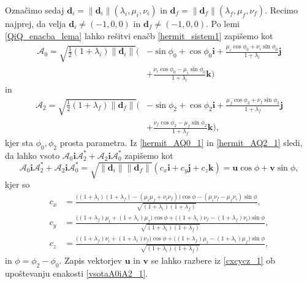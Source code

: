 \documentclass[12pt,a4paper,twoside]{article}
\theoremstyle{definition} %
\theoremstyle{plain} %
\theoremstyle{primerstyle}
\numberwithin{equation}{section}  %
\newcommand{\dV}{\mathbf{d}}
\newcommand{\iV}{\mathbf{i}}
\newcommand{\jV}{\mathbf{j}}
\newcommand{\kV}{\mathbf{k}}
\newcommand{\uV}{\mathbf{u}}
\newcommand{\vV}{\mathbf{v}}
\newcommand{\AQ}{\mathcal{A}}
\begin{document}
Označimo sedaj $\dV_i=\lVert\dV_i\rVert(\lambda_i,\mu_i,\nu_i)$ in $\dV_f=\lVert\dV_f\rVert(\lambda_f,\mu_f,\nu_f).$ Recimo najprej, da velja $\dV_i\neq(-1,0,0)$ in $\dV_f\neq(-1,0,0).$ Po lemi \ref{QiQ_enacba_lema} lahko rešitvi enačb \eqref{hermit_sistem1} zapišemo kot
\begin{align}
	\label{hermit_AQ0_1}
	\AQ_0=\sqrt{\frac{1}{2}(1+\lambda_i)\lVert\dV_i\rVert}\Big(&-\sin\phi_0+\cos\phi_0\iV+\frac{\mu_i\cos\phi_0+\nu_i\sin\phi_0}{1+\lambda_i}\jV\nonumber\\
		&+\frac{\nu_i\cos\phi_0-\mu_i\sin\phi_0}{1+\lambda_i}\kV\Big)
\end{align}
in
\begin{align}
	\label{hermit_AQ2_1}
	\AQ_2=\sqrt{\frac{1}{2}(1+\lambda_f)\lVert\dV_f\rVert}\Big(&-\sin\phi_2+\cos\phi_2\iV+\frac{\mu_f\cos\phi_2+\nu_f\sin\phi_2}{1+\lambda_f}\jV\nonumber\\
		&+\frac{\nu_f\cos\phi_2-\mu_f\sin\phi_2}{1+\lambda_f}\kV\Big),
\end{align}
kjer sta $\phi_0,\phi_2$ prosta parametra. %
Iz \eqref{hermit_AQ0_1} in \eqref{hermit_AQ2_1} sledi, da lahko vsoto $\AQ_0\iV\AQ_2^*+\AQ_2\iV\AQ_0^*$ zapišemo kot
\begin{equation}
	\label{vsotaA0iA2_1}
	\AQ_0\iV\AQ_2^*+\AQ_2\iV\AQ_0^*=\sqrt{\lVert\dV_i\rVert\lVert\dV_f\rVert}(c_x\iV+c_y\jV+c_z\kV)=\uV\cos\phi+\vV\sin\phi,
\end{equation}
kjer so
\begin{align}
	\label{cxcycz_1}
	c_x&=\frac{\big((1+\lambda_i)(1+\lambda_f)-(\mu_i\mu_f+\nu_i\nu_f)\big)\cos\phi-(\mu_i\nu_f-\mu_f\nu_i)\sin\phi}{\sqrt{(1+\lambda_i)(1+\lambda_f)}},\nonumber\\
	c_y&=\frac{\big((1+\lambda_f)\mu_i+(1+\lambda_i)\mu_f\big)\cos\phi+\big((1+\lambda_i)\nu_f-(1+\lambda_f)\nu_i\big)\sin\phi}{\sqrt{(1+\lambda_i)(1+\lambda_f)}},\\
	c_z&=\frac{\big((1+\lambda_f)\nu_i+(1+\lambda_i)\nu_f\big)\cos\phi+\big((1+\lambda_f)\mu_i-(1+\lambda_i)\mu_f\big)\sin\phi}{\sqrt{(1+\lambda_i)(1+\lambda_f)}},\nonumber
\end{align}
in $\phi=\phi_2-\phi_0.$ Zapis vektorjev $\uV$ in $\vV$ se lahko razbere iz \eqref{cxcycz_1} ob upoštevanju enakosti \eqref{vsotaA0iA2_1}.
\end{document}
